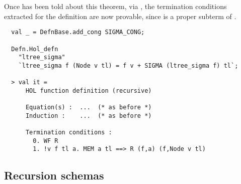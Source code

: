%
Once  has been told about this theorem, via
, the termination conditions extracted for
the definition are now provable, since  is a
proper subterm of .
%
\begin{session}
\begin{verbatim}
  val _ = DefnBase.add_cong SIGMA_CONG;

  Defn.Hol_defn
    "ltree_sigma"
    `ltree_sigma f (Node v tl) = f v + SIGMA (ltree_sigma f) tl`;

  > val it =
      HOL function definition (recursive)

      Equation(s) :  ...  (* as before *)
      Induction :    ...  (* as before *)

      Termination conditions :
        0. WF R
        1. !v f tl a. MEM a tl ==> R (f,a) (f,Node v tl)
\end{verbatim}
\end{session}

\subsection{Recursion schemas}

